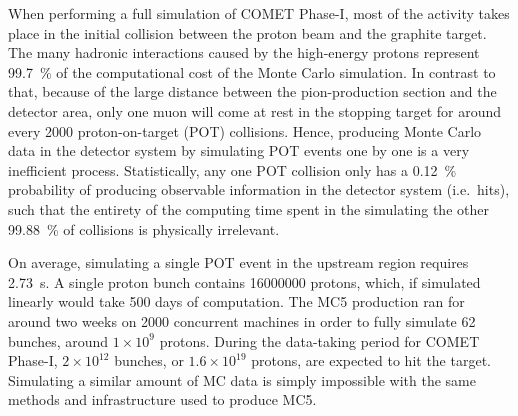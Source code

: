 When performing a full simulation of COMET Phase-I, most of the activity takes place in the initial collision between the proton beam and the graphite target. The many hadronic interactions caused by the high-energy protons represent \SI{99.7}{\percent} of the computational cost of the Monte Carlo simulation.
In contrast to that, because of the large distance between the pion-production section and the detector area, only one muon will come at rest in the stopping target for around every \num{2000} proton-on-target (POT) collisions. Hence, producing Monte Carlo data in the detector system by simulating POT events one by one is a very inefficient process. 
Statistically, any one POT collision only has a \SI{0.12}{\percent} probability of producing observable information in the detector system (i.e.\ hits), such that the entirety of the computing time spent in the simulating the other \SI{99.88}{\percent} of collisions is physically irrelevant.


On average, simulating a single POT event in the upstream region requires \SI{2.73}{\second}. A single proton bunch contains \num{16000000} protons, which, if simulated linearly would take 500 days of computation. The MC5 production ran for around two weeks on 2000 concurrent machines in order to fully simulate 62 bunches, around $1\times10^9$ protons. During the data-taking period for COMET Phase-I, $2\times10^{12}$ bunches, or $1.6\times 10^{19}$ protons, are expected to hit the target. Simulating a similar amount of MC data is simply impossible with the same methods and infrastructure used to produce MC5.

